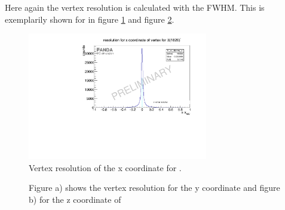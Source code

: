 	Here again the vertex resolution is calculated with the FWHM. 
	This is exemplarily shown for \excitedcascade in figure \ref{fig:Xi1820_vtxx} and figure \ref{fig:Xi1820_vtxyz}.
	
	\begin{figure}
		\centering
		\includegraphics[width=0.7\textwidth]{./plots/Xi1820/XiMinus1820_vtxres_x.pdf}
		\caption{\propose Vertex resolution of the x coordinate for \excitedcascade.}
		\label{fig:Xi1820_vtxx}
	\end{figure}
	
	 \begin{figure}
		\centering
		\caption{\propose Figure a) shows the vertex resolution for the y coordinate and figure b) for the z coordinate of \excitedcascade}
		\label{fig:Xi1820_vtxyz}
	\end{figure}
	
